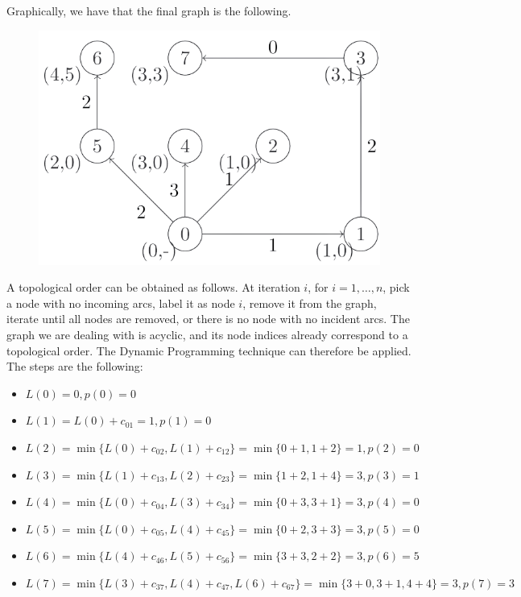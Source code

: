 \documentclass[12pt, a4paper]{report}
\begin{document}
        Graphically, we have that the final graph is the following. 
        \begin{figure}[H]
            \centering
            \includegraphics[width=0.5\linewidth]{images/dijksol.png}
        \end{figure}
        A topological order can be obtained as follows. At iteration $i$, for $i = 1, \dots , n$, pick a node with no incoming arcs, label it as node $i$, remove it from 
        the graph, iterate until all nodes are removed, or there is no node with no incident arcs. The graph we are dealing with is acyclic, and its node indices already 
        correspond to a topological order. The Dynamic Programming technique can therefore be applied. The steps are the following: 
        \begin{itemize}
            \item $L(0) = 0, p(0) = 0$
            \item $L(1) = L(0) + c_{01} = 1, p(1) = 0$
            \item $L(2) = \min\{L(0) + c_{02}, L(1) + c_{12}\} = \min\{0 + 1, 1 + 2\} = 1, p(2) = 0$
            \item $L(3) = \min\{L(1) + c_{13}, L(2) + c_{23}\} = \min\{1 + 2, 1 + 4\} = 3, p(3) = 1$
            \item $L(4) = \min\{L(0) + c_{04}, L(3) + c_{34}\} = \min\{0 + 3, 3 + 1\} = 3, p(4) = 0$
            \item $L(5) = \min\{L(0) + c_{05}, L(4) + c_{45}\} = \min\{0 + 2, 3 + 3\} = 3, p(5) = 0$
            \item $L(6) = \min\{L(4) + c_{46}, L(5) + c_{56}\} = \min\{3 + 3, 2 + 2\} = 3, p(6) = 5$
            \item $L(7) = \min\{L(3) + c_{37}, L(4) + c_{47}, L(6) + c_{67}\} = \min\{3 + 0, 3 + 1, 4 + 4\} = 3, p(7) = 3$
        \end{itemize}

    \newpage
    
\end{document}

